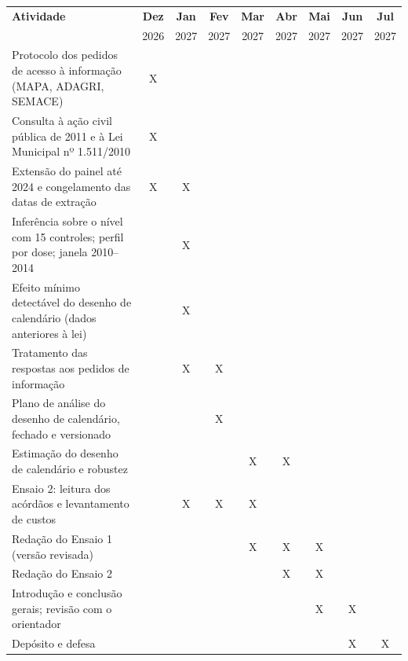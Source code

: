 \begin{quadro}[htb]
\centering
\caption{Cronograma de atividades}
\label{qua:cronograma}
\footnotesize
\setlength{\tabcolsep}{4pt}
\begin{tabular}{|p{7.4cm}|c|c|c|c|c|c|c|c|}
\hline
\textbf{Atividade} & \textbf{Dez} & \textbf{Jan} & \textbf{Fev} & \textbf{Mar}
  & \textbf{Abr} & \textbf{Mai} & \textbf{Jun} & \textbf{Jul} \\
 & 2026 & 2027 & 2027 & 2027 & 2027 & 2027 & 2027 & 2027 \\
\hline
Protocolo dos pedidos de acesso à informação (MAPA, ADAGRI, SEMACE)
  & X &   &   &   &   &   &   &   \\ \hline
Consulta à ação civil pública de 2011 e à Lei Municipal nº 1.511/2010
  & X &   &   &   &   &   &   &   \\ \hline
Extensão do painel até 2024 e congelamento das datas de extração
  & X & X &   &   &   &   &   &   \\ \hline
Inferência sobre o nível com 15 controles; perfil por dose; janela 2010--2014
  &   & X &   &   &   &   &   &   \\ \hline
Efeito mínimo detectável do desenho de calendário (dados anteriores à lei)
  &   & X &   &   &   &   &   &   \\ \hline
Tratamento das respostas aos pedidos de informação
  &   & X & X &   &   &   &   &   \\ \hline
Plano de análise do desenho de calendário, fechado e versionado
  &   &   & X &   &   &   &   &   \\ \hline
Estimação do desenho de calendário e robustez
  &   &   &   & X & X &   &   &   \\ \hline
Ensaio 2: leitura dos acórdãos e levantamento de custos
  &   & X & X & X &   &   &   &   \\ \hline
Redação do Ensaio 1 (versão revisada)
  &   &   &   & X & X & X &   &   \\ \hline
Redação do Ensaio 2
  &   &   &   &   & X & X &   &   \\ \hline
Introdução e conclusão gerais; revisão com o orientador
  &   &   &   &   &   & X & X &   \\ \hline
Depósito e defesa
  &   &   &   &   &   &   & X & X \\ \hline
\end{tabular}
\end{quadro}
